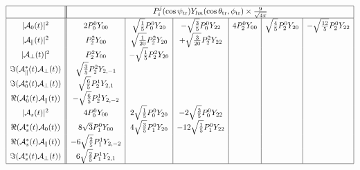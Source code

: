\documentclass[a4paper,9pt,twoside]{article}
\def\thetatr{\theta_\mathrm{tr}}
\def\phitr{\phi_\mathrm{tr}}
\def\psitr{\psi_\mathrm{tr}}
\begin{document}
\begin{equation}
\begin{array}{|c|| c | c | c | c | c | c |}
 \hline
&\multicolumn{6}{|c|}{ P_i^j(\cos\psitr)Y_{lm}(\cos\thetatr,\phitr) \times \frac{9}{\sqrt{4\pi}} } \\
 \hline
|{\cal A}_0(t)|^2                       &  2 P_0^0Y_{00}  & \sqrt{\frac{1}{5}} P_0^0 Y_{20} & -\sqrt{\frac{3}{5}} P_0^0 Y_{22}
                                        &  4 P_2^0Y_{00}  & \sqrt{\frac{4}{5}} P_2^0 Y_{20} & -\sqrt{\frac{12}{5}} P_2^0 Y_{22} \\
|{\cal A}_\parallel(t)|^2               &    P_2^2Y_{00} &  \sqrt{\frac{1}{20}} P_2^2 Y_{20} & +\sqrt{\frac{3}{20}} P_2^2Y_{22} & && \\
|{\cal A}_\perp(t)|^2                   &  P_2^2 Y_{00} & -\sqrt{\frac{1}{5}} P_2^2 Y_{20} &                                 &&& \\
\Im({\cal A}_\parallel^*(t){\cal A}_\perp(t)) &  \sqrt{\frac{3}{5}} P_2^2 Y_{2,-1} &&&&&\\
\Im({\cal A}_0^*(t){\cal A}_\perp(t))         &  \sqrt{\frac{6}{5}} P_2^1 Y_{2,1} &&&&&\\
\Re({\cal A}_0^*(t){\cal A}_\parallel(t))     & -\sqrt{\frac{6}{5}} P_2^1 Y_{2,-2} &&&&&\\
|{\cal A}_{s}(t)|^2                   &  4 P_0^0 Y_{00} & 2 \sqrt{\frac{1}{5}} P_0^0 Y_{20} & -2 \sqrt{\frac{3}{5}} P_0^0 Y_{22}                                &&& \\
\Re({\cal A}_{s}^*(t){\cal A}_0(t))   &  8 \sqrt{3} P_1^0 Y_{00} & 4 \sqrt{\frac{3}{5}} P_1^0 Y_{20} & - 12 \sqrt{\frac{1}{5}} P_1^0 Y_{22}                       &&& \\
\Re({\cal A}_{s}^*(t){\cal A}_\parallel(t))   &  -6\sqrt{\frac{2}{5}} P_1^1 Y_{2,-2} &&&&& \\
\Im({\cal A}_{s}^*(t){\cal A}_\perp(t))     &  6\sqrt{\frac{2}{5}} P_1^1 Y_{2,1} &&&&& \\
 \hline
\end{array}
\end{equation}
\end{document}
